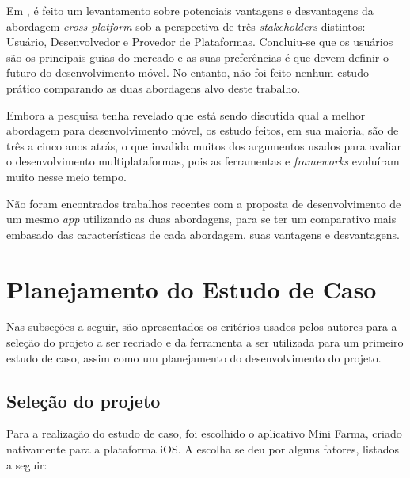 Em , é feito um levantamento sobre potenciais vantagens e desvantagens da abordagem \textit{cross-platform} sob a 
perspectiva de três \textit{stakeholders} distintos: Usuário, Desenvolvedor e Provedor de Plataformas. Concluiu-se que os usuários são os principais
guias do mercado e as suas preferências é que devem definir o futuro do desenvolvimento móvel. No entanto, não foi feito nenhum estudo prático comparando
as duas abordagens alvo deste trabalho.

Embora a pesquisa tenha revelado que está sendo discutida qual a melhor abordagem para desenvolvimento móvel, os estudo feitos, em sua maioria, são de três a cinco 
anos atrás, o que invalida muitos dos argumentos usados para avaliar o desenvolvimento multiplataformas, pois as ferramentas e \textit{frameworks} evoluíram muito nesse
meio tempo. 

Não foram encontrados trabalhos recentes com a proposta de desenvolvimento de um mesmo \textit{app} utilizando as duas abordagens, para se ter um comparativo mais embasado das
características de cada abordagem, suas vantagens e desvantagens.
 
\begin{comment}
Falar que tem mt trabalho comparativo de nativo e cross, mas não refletem a atualidades, pois mudou muito em poucos anos.
e nao ha um estudo comparativo
tenho 3 plataformas, o cross surgiu como uma solucao, e queremos confirmar se eh mesmo uma solucao
da pra confiar nessa abordagem pra todos os desenvolvimentos de apps?    
\end{comment}

\section{Planejamento do Estudo de Caso} \label{section:planejamentoestudodecaso}

Nas subseções a seguir, são apresentados os critérios usados pelos autores para a seleção do projeto a ser recriado e da ferramenta a ser utilizada para um primeiro estudo de caso, assim como um planejamento
do desenvolvimento do projeto.

\subsection{Seleção do projeto} \label{subsection:selecaodoprojeto}

Para a realização do estudo de caso, foi escolhido o aplicativo Mini Farma, criado nativamente para a plataforma iOS. A escolha se deu por alguns fatores, listados a seguir:

